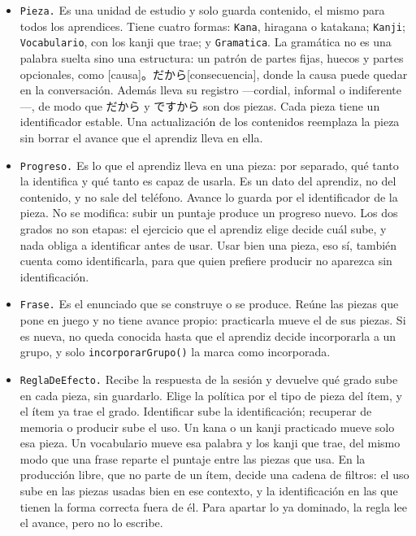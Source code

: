 \documentclass[11pt]{article}
\newcommand{\jp}[1]{{\cjk #1}}
\begin{document}
\begin{description}
\begin{itemize}
    \item \texttt{Pieza.} Es una unidad de estudio y solo guarda contenido, el mismo para todos los aprendices. Tiene cuatro formas: \texttt{Kana}, hiragana o katakana; \texttt{Kanji}; \texttt{Vocabulario}, con los kanji que trae; y \texttt{Gramatica}. La gramática no es una palabra suelta sino una estructura: un patrón de partes fijas, huecos y partes opcionales, como [causa]\jp{。だから}[consecuencia], donde la causa puede quedar en la conversación. Además lleva su registro ---cordial, informal o indiferente---, de modo que \jp{だから} y \jp{ですから} son dos piezas. Cada pieza tiene un identificador estable. Una actualización de los contenidos reemplaza la pieza sin borrar el avance que el aprendiz lleva en ella.
    \item \texttt{Progreso.} Es lo que el aprendiz lleva en una pieza: por separado, qué tanto la identifica y qué tanto es capaz de usarla. Es un dato del aprendiz, no del contenido, y no sale del teléfono. Avance lo guarda por el identificador de la pieza. No se modifica: subir un puntaje produce un progreso nuevo. Los dos grados no son etapas: el ejercicio que el aprendiz elige decide cuál sube, y nada obliga a identificar antes de usar. Usar bien una pieza, eso sí, también cuenta como identificarla, para que quien prefiere producir no aparezca sin identificación.
    \item \texttt{Frase.} Es el enunciado que se construye o se produce. Reúne las piezas que pone en juego y no tiene avance propio: practicarla mueve el de sus piezas. Si es nueva, no queda conocida hasta que el aprendiz decide incorporarla a un grupo, y solo \texttt{incorporarGrupo()} la marca como incorporada.
    \item \texttt{ReglaDeEfecto.} Recibe la respuesta de la sesión y devuelve qué grado sube en cada pieza, sin guardarlo. Elige la política por el tipo de pieza del ítem, y el ítem ya trae el grado. Identificar sube la identificación; recuperar de memoria o producir sube el uso. Un kana o un kanji practicado mueve solo esa pieza. Un vocabulario mueve esa palabra y los kanji que trae, del mismo modo que una frase reparte el puntaje entre las piezas que usa. En la producción libre, que no parte de un ítem, decide una cadena de filtros: el uso sube en las piezas usadas bien en ese contexto, y la identificación en las que tienen la forma correcta fuera de él. Para apartar lo ya dominado, la regla lee el avance, pero no lo escribe.
  \end{itemize}
\end{description}
\end{document}
